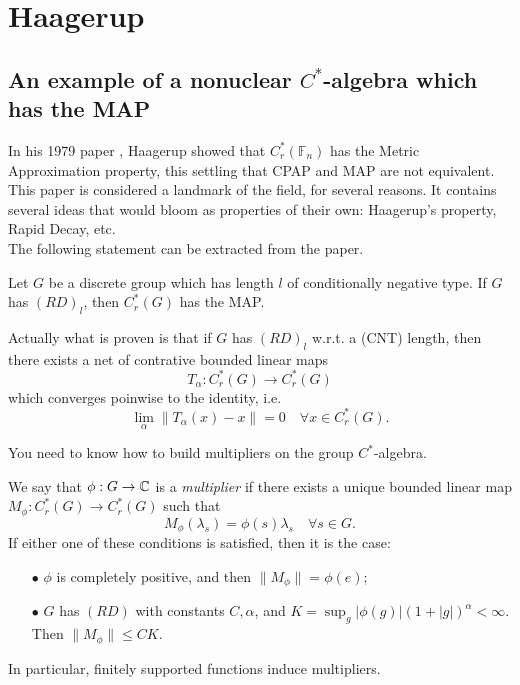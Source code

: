 \newpage
\section{Haagerup}

\subsection{An example of a nonuclear $C^*$-algebra which has the MAP}

In his 1979 paper \cite{}, Haagerup showed that $C^*_r(\mathbb F_n)$ has the Metric Approximation property, this settling that CPAP and MAP are not equivalent. This paper is considered a landmark of the field, for several reasons. It contains several ideas that would bloom as properties of their own: Haagerup's property, Rapid Decay, etc.\\

The following statement can be extracted from the paper.

\begin{thm}
Let $G$ be a discrete group which has length $l$ of conditionally negative type. If $G$ has $(RD)_l$, then $C^*_r (G)$ has the MAP.
\end{thm}

Actually what is proven is that if $G$ has $(RD)_l$ w.r.t. a (CNT) length, then there exists a net of contrative bounded linear maps
\[T_\alpha : C^*_r (G) \rightarrow C^*_r (G)\]
which converges poinwise to the identity, i.e.
\[\lim_\alpha \|T_\alpha(x) - x\| = 0 \quad \forall x\in C_r^*(G).\]

You need to know how to build multipliers on the group $C^*$-algebra.
\begin{lem}
We say that $\phi: G \rightarrow \mathbb C$ is a \textit{multiplier} if there exists a unique bounded linear map $M_\phi :  C_r^*(G) \rightarrow  C_r^*(G)$ such that 
\[M_\phi(\lambda_s ) = \phi(s)\lambda_s\quad \forall s\in G.\]
If either one of these conditions is satisfied, then it is the case:
\begin{itemize}
\item[$\bullet$] $\phi$ is completely positive, and then $\| M_\phi\| = \phi(e)$;
\item[$\bullet$] $G$ has $(RD)$ with constants $C,\alpha$, and $K= \sup_{g} |\phi(g)|(1+|g|)^\alpha <\infty$. Then $\| M_\phi\|\leq CK$.
\end{itemize} 
In particular, finitely supported functions induce multipliers.
\end{lem}

